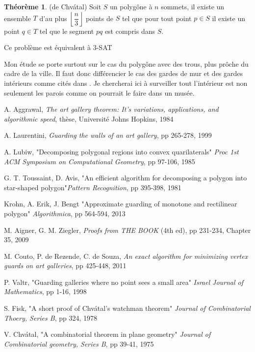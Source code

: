 \documentclass[12pt]{article}
\newcommand{\<}{\langle}
\renewcommand{\>}{\rangle}
\theoremstyle{definition}
\newtheorem{theorem}{Théorème}
\begin{document}
\begin{theorem}(de Chvátal)
    Soit \(S\) un polygône à \(n\) sommets, il existe un ensemble \(T\) d'au 
    plus \(\left\lfloor \dfrac{n}{3} \right\rfloor\) points de \(S\) tel que 
    pour tout point \(p \in S\) il existe un point \(q \in T\) tel que le segment 
    \(pq\) est compris dans \(S\).
    
\end{theorem}

\begin{center}
    Ce problème est équivalent à 3-SAT \cite{Aldo,Krohn}
\end{center}

Mon étude se porte surtout sur le cas du polygône avec des trous, plus 
prôche du cadre de la ville. Il faut donc différencier le cas des gardes de mur 
et des gardes intérieurs comme cités dans \cite{Aldo}. Je chercherai ici à surveiller 
tout l'intérieur est non seulement les parois comme on pourrait le faire dans 
un musée.

\begin{thebibliography}{100}
    
    \addtolength{\leftmargin}{0.2in} %
    \setlength{\itemindent}{-0.2in}

     A. Aggrawal, \textsl{The art gallery theorem: It's variations,
    applications, and algorithmic speed}, thèse, Université Johns Hopkins, 1984

     A. Laurentini, \textsl{Guarding the walls of an art gallery},
    pp 265-278, 1999

     A. Lubiw, "Decomposing polygonal regions into convex 
    quarilaterals" \textsl{Proc 1st ACM Symposium on Computational Geometry},
    pp 97-106, 1985

     G. T. Toussaint, D. Avis, "An efficient algorithm for 
    decomposing a polygon into star-shaped polygon"\textsl{Pattern Recognition}, 
    pp 395-398, 1981

     Krohn, A. Erik, J. Bengt "Approximate guarding of 
    monotone and rectilinear polygon" \textsl{Algorithmica}, pp 564-594, 2013

     M. Aigner, G. M. Ziegler, \textsl{Proofs from THE BOOK}  
    (4th ed), pp 231-234, Chapter 35, 2009

     M. Couto, P. de Rezende, C. de Souza, \textsl{An exact algorithm
    for minimizing vertex guards on art galleries}, pp 425-448, 2011

     P. Valtr, "Guarding galleries where no point sees a small 
    area" \textsl{Israel Journal of Mathematics}, pp 1-16, 1998
    
     S. Fisk, "A short proof of Chvátal's watchman theorem" 
    \textsl{Journal of Combinatorial Thoery, Series B}, pp 324, 1978

     V. Chvátal, "A combinatorial theorem in plane geometry" 
    \textsl{Journal of Combinatorial geometry, Series B}, pp 39-41, 1975

\end{thebibliography}
\end{document}
